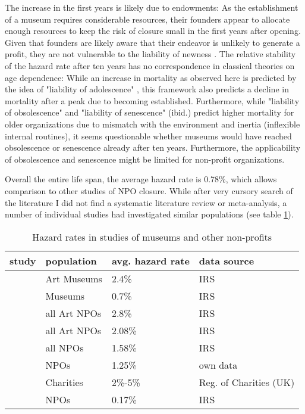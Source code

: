 \documentclass[12pt]{article}
\begin{document}
The increase in the first years is likely due to endowments: As the establishment of a museum requires considerable resources, their founders appear to allocate enough resources to keep the risk of closure small in the first years after opening.
Given that founders are likely aware that their endeavor is unlikely to generate a profit, they are not vulnerable to the liability of newness \parencite{Stinchcombe_1965_structure}.
The relative stability of the hazard rate after ten years has no correspondence in classical theories on age dependence:
While an increase in mortality as observed here is predicted by the idea of "liability of adolescence" \parencite{Carroll_Khessina_2019_demography}, this framework also predicts a decline in mortality after a peak due to becoming established.
Furthermore, while "liability of obsolescence" and "liability of senescence" (ibid.) predict higher mortality for older organizations due to mismatch with the environment and inertia (inflexible internal routines), it seems questionable whether museums would have reached obsolescence or senescence already after ten years.
Furthermore, the applicability of obsolescence and senescence might be limited for non-profit organizations.


Overall the entire life span, the average hazard rate is 0.78\%, which allows comparison to other studies of NPO closure.
While after very cursory search of the literature I did not find a systematic literature review or meta-analysis, a number of individual studies had investigated similar populations (see table \ref{tbl:litreview}).

\begin{table}[htbp]
\caption{\label{tbl:litreview}Hazard rates in studies of museums and other non-profits}
\centering
\begin{tabular}{llll}
\hline
study & population & avg. hazard rate & data source\\
\hline
\cite{Hager_2001_vulnerability} & Art Museums & 2.4\% & IRS\\
\cite{Gordon_etal_2013_insolvency} & Museums & 0.7\% & IRS\\
\hline
\cite{Hager_2001_vulnerability} & all Art NPOs & 2.8\% & IRS\\
\cite{Gordon_etal_2013_insolvency} & all Art NPOs & 2.08\% & IRS\\
\cite{Gordon_etal_2013_insolvency} & all NPOs & 1.58\% & IRS\\
\cite{Hager_Galaskiewicz_Larson_2007_liability} & NPOs & 1.25\% & own data\\
\cite{Clifford_2018_reinforcing} & Charities & 2\%-5\% & Reg. of Charities (UK)\\
\cite{Mayer_2022_slimmer} & NPOs & 0.17\% & IRS\\
\hline
\end{tabular}
\end{table}
\end{document}

